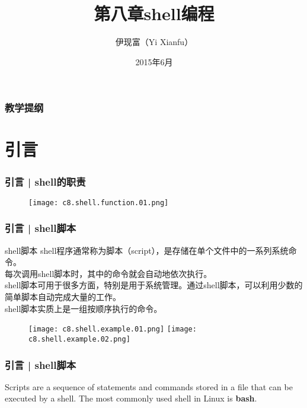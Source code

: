 



\title[shell编程]{第八章\quad shell编程}
\author[Yixf]{伊现富（Yi Xianfu）}
\date{2015年6月}


\begin{frame}
  \titlepage
\end{frame}

\begin{frame}[plain,label=current]
  \frametitle{教学提纲}
  \setcounter{tocdepth}{3}
  \begin{multicols}{2}
    \tableofcontents
  \end{multicols}
\end{frame}


\section{引言}
\begin{frame}
  \frametitle{引言 | shell的职责}
  \begin{figure}
    \centering
    \texttt{[image: c8.shell.function.01.png]}
  \end{figure}
\end{frame}

\begin{frame}
  \frametitle{引言 | shell脚本}
  \begin{block}{shell脚本}
    shell程序通常称为脚本（script），是存储在单个文件中的一系列系统命令。\\
    每次调用shell脚本时，其中的命令就会自动地依次执行。\\
    shell脚本可用于很多方面，特别是用于系统管理。通过shell脚本，可以利用少数的简单脚本自动完成大量的工作。\\
    shell脚本实质上是一组按顺序执行的命令。
  \end{block}
  \begin{figure}
    \centering
    \texttt{[image: c8.shell.example.01.png]}
    \texttt{[image: c8.shell.example.02.png]}
  \end{figure}
\end{frame}

\begin{frame}
  \frametitle{引言 | shell脚本}
  Scripts are a sequence of statements and commands stored in a file that can be executed by a shell. The most commonly used shell in Linux is \textbf{bash}.
\end{frame}

